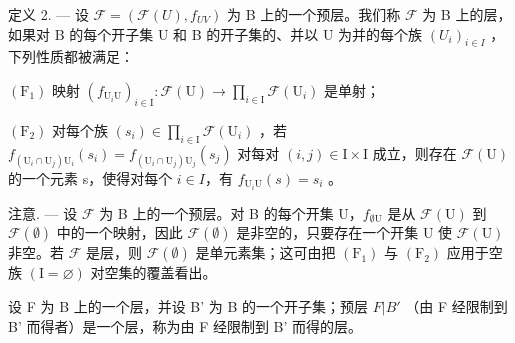 定义 2. --- 设 \(\mathcal{F} = (\mathcal{F}(U), f_{UV})\) 为 B 上的一个预层。我们称 \(\mathcal{F}\) 为 B 上的层，如果对 B 的每个开子集 U 和 B 的开子集的、并以 U 为并的每个族 \((U_i)_{i \in I}\) ，下列性质都被满足：

\((\mathrm{F}_{1})\) 映射 \((f_{\mathrm{U}_{i}\mathrm{U}})_{i\in\mathrm{I}}\colon\mathcal{F}(\mathrm{U})\to\prod_{i\in\mathrm{I}}\mathcal{F}(\mathrm{U}_{i})\) 是单射；

\((\mathrm{F}_{2})\) 对每个族 \((s_{i}) \in \prod_{i \in \mathrm{I}} \mathcal{F}(\mathrm{U}_{i})\) ，若 \(f_{(\mathrm{U}_{i} \cap \mathrm{U}_{j})\mathrm{U}_{i}}(s_{i}) = f_{(\mathrm{U}_{i} \cap \mathrm{U}_{j})\mathrm{U}_{j}}(s_{j})\) 对每对 \((i, j) \in \mathrm{I} \times \mathrm{I}\) 成立，则存在 \(\mathcal{F}(\mathrm{U})\) 的一个元素 s，使得对每个 \(i \in I\)，有 \(f_{\mathrm{U}_{i}\mathrm{U}}(s) = s_{i}\) 。

注意. --- 设 \(\mathcal{F}\) 为 B 上的一个预层。对 B 的每个开集 U，\(f_{\emptyset \mathrm{U}}\) 是从 \(\mathcal{F}(\mathrm{U})\) 到 \(\mathcal{F}(\emptyset)\) 中的一个映射，因此 \(\mathcal{F}(\emptyset)\) 是非空的，只要存在一个开集 U 使 \(\mathcal{F}(\mathrm{U})\) 非空。若 \(\mathcal{F}\) 是层，则 \(\mathcal{F}(\emptyset)\) 是单元素集；这可由把 \((\mathrm{F}_{1})\) 与 \((\mathrm{F}_{2})\) 应用于空族 \((\mathrm{I}=\varnothing)\) 对空集的覆盖看出。

设 F 为 B 上的一个层，并设 B' 为 B 的一个开子集；预层 \(F|B'\) （由 F 经限制到 B' 而得者）是一个层，称为由 F 经限制到 B' 而得的层。

